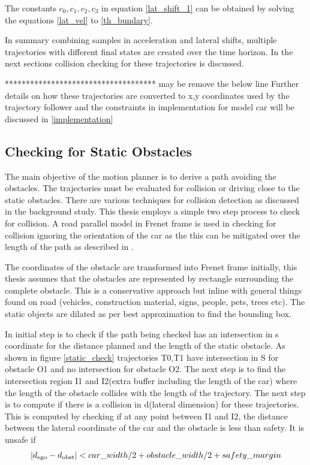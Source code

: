 

The constants $ { c_0,c_1,c_2,c_3}  $ in equation \ref{lat_shift_1} can be obtained by solving the equations \ref{lat_vel} to \ref{th_bundary}.

In summary combining samples in acceleration and lateral shifts, multiple trajectories with different final states are created over the time horizon. In the next sections collision checking for these trajectories is discussed. 


************************************ may be remove the below line
Further details on how these trajectories are converted to x,y coordinates used by the trajectory follower and the constraints in implementation for model car will be discussed in \ref{implementation}


\newpage


\subsection{Checking for Static Obstacles} \label{osbtacle_check_satic}
The main objective of the motion planner is to derive a path avoiding the obstacles. The trajectories must be evaluated for collision or driving close to the static obstacles. There are various techniques for collision detection as discussed in the background study. This thesis employs a simple two step process to check for collision. A road parallel model in Frenet frame is used in checking for collision ignoring the orientation of the car as the this can be mitigated over the length of the path as described in \cite{cmu_parallel_thesis}. 


The coordinates of the obstacle are transformed into Frenet frame initially, this thesis assumes that the obstacles are represented by rectangle surrounding the complete obstacle. This is a conservative approach but inline with general things found on road (vehicles, construction material, signs, people, pets, trees etc). The static objects are dilated as per best approximation to find the bounding box. 

In initial step is to check if the path being checked has an intersection in s coordinate for the distance planned and the length of the static obstacle. As shown in figure \ref{static_check} trajectories T0,T1 have intersection in S for obstacle O1 and no intersection for obstacle O2. The next step is to find the intersection region I1 and I2(extra buffer including the length of the car) where the length of the obstacle collides with the length of the trajectory. The next step is to compute if there is a collision in d(lateral dimension) for these trajectories. This is computed by checking if at any point between I1 and I2, the distance between the lateral coordinate of the car and the obstacle is less than safety. It is unsafe if 
\begin{equation}
    |d\textsubscript{ego} - d\textsubscript{obst}| < car\_width/2 + obstacle\_width/2 + safety\_margin
    \label{static_obst_safety_dist}
\end{equation}

